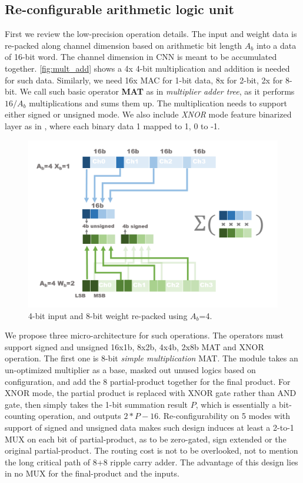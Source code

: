 \subsection{Re-configurable arithmetic logic unit}
First we review the low-precision operation details. The input and weight data is re-packed along channel dimension based on arithmetic bit length $A_b$ into a data of 16-bit word. The channel dimension in CNN is meant to be accumulated together. \autoref{fig:mult_add} shows a 4x 4-bit multiplication and addition is needed for such data. Similarly, we need 16x MAC for 1-bit data, 8x for 2-bit, 2x for 8-bit. We call such basic operator \textbf{MAT} as in \textit{multiplier adder tree}, as it performs $16/A_b$ multiplications and sums them up. The multiplication needs to support either signed or unsigned mode. We also include \textit{XNOR} mode feature binarized layer as in \cite{XnorNet}, where each binary data 1 mapped to 1, 0 to -1. \\
\begin{figure}[h]
    \centering
    \includegraphics[width=1\linewidth]{inc/4_proposed_architecture/figure/mult_add.png}
    \caption{4-bit input and 8-bit weight re-packed using $A_b$=4.}
    \label{fig:mult_add}
\end{figure}
We propose three micro-architecture for such operations. The operators must support signed and unsigned 16x1b, 8x2b, 4x4b, 2x8b MAT and XNOR operation. The first one is 8-bit \textit{simple multiplication} MAT. The module takes an un-optimized multiplier as a base, masked out unused logics based on configuration, and add the 8 partial-product together for the final product. For XNOR mode, the partial product is replaced with XNOR gate rather than AND gate, then simply takes the 1-bit summation result \textbf{$P$}, which is essentially a bit-counting operation, and outputs $2*P-16$. Re-configurability on 5 modes with support of signed and unsigned data makes such design induces at least a 2-to-1 MUX on each bit of partial-product, as to be zero-gated, sign extended or the original partial-product. The routing cost is not to be overlooked, not to mention the long critical path of 8+8 ripple carry adder. The advantage of this design lies in no MUX for the final-product and the inputs. \\
